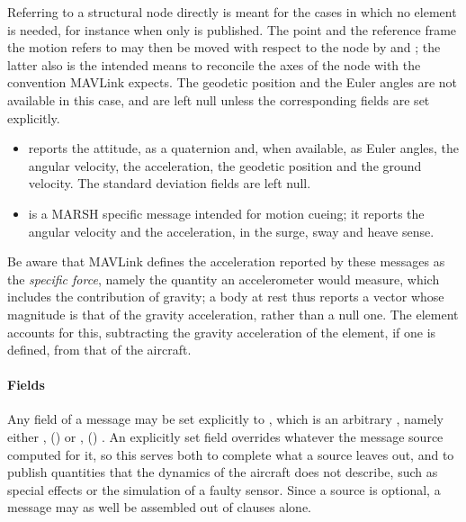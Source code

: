 Referring to a structural node directly is meant for the cases in which no
 element is needed, for instance when only
 is published.
The point and the reference frame the motion refers to may then be moved
with respect to the node by  and ; the latter
also is the intended means to reconcile the axes of the node with the
convention MAVLink expects.
The geodetic position and the Euler angles are not available in this case,
and are left null unless the corresponding fields are set explicitly.

\begin{itemize}
    \item {} reports the attitude, as a quaternion and, when
        available, as Euler angles, the angular velocity, the acceleration,
        the geodetic position and the ground velocity.
        The standard deviation fields are left null.
    \item {} is a MARSH specific message intended for
        motion cueing; it reports the angular velocity and the acceleration,
        in the surge, sway and heave sense.
\end{itemize}

Be aware that MAVLink defines the acceleration reported by these messages as
the \emph{specific force}, namely the quantity an accelerometer would
measure, which includes the contribution of gravity; a body at rest thus
reports a vector whose magnitude is that of the gravity acceleration, rather
than a null one.
The element accounts for this, subtracting the gravity acceleration of the
 element, if one is defined, from that of the aircraft.

\paragraph{Fields}
Any field of a message may be set explicitly to , which is
an arbitrary , namely either
 , () 
or
 , () .
An explicitly set field overrides whatever the message source computed for
it, so this serves both to complete what a source leaves out, and to publish
quantities that the dynamics of the aircraft does not describe, such as
special effects or the simulation of a faulty sensor.
Since a source is optional, a message may as well be assembled out of
 clauses alone.

